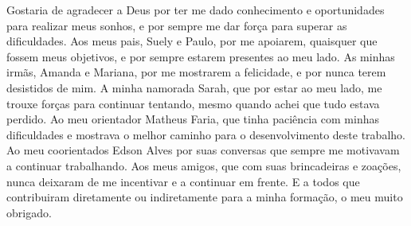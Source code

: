 \begin{agradecimentos}
	Gostaria de agradecer a Deus por ter me dado conhecimento e oportunidades para realizar meus sonhos, e por sempre me dar força para superar as dificuldades. Aos meus pais, Suely e Paulo, por me apoiarem, quaisquer que fossem meus objetivos, e por sempre estarem presentes ao meu lado. As minhas irmãs, Amanda e Mariana, por me mostrarem a felicidade, e por nunca terem desistidos de mim. A minha namorada Sarah, que por estar ao meu lado, me trouxe forças para continuar tentando, mesmo quando achei que tudo estava perdido. Ao meu orientador Matheus Faria, que tinha paciência com minhas dificuldades e mostrava o melhor caminho para o desenvolvimento deste trabalho. Ao meu coorientados Edson Alves por suas conversas que sempre me motivavam a continuar trabalhando. Aos meus amigos, que com suas brincadeiras e zoações, nunca deixaram de me incentivar e a continuar em frente. E a todos que contribuiram diretamente ou indiretamente para a minha formação, o meu muito obrigado. 
\end{agradecimentos}